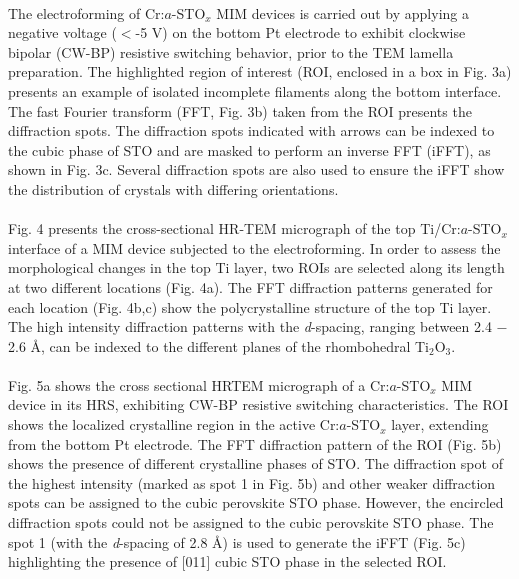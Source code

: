 \documentclass{osa-article}
\begin{document}
\paragraph*{}
The electroforming of Cr:$a$-STO$_{x}$ MIM devices is carried out by applying a negative voltage ($<$-5 V) on the bottom Pt electrode to exhibit clockwise bipolar (CW-BP) resistive switching behavior, prior to the TEM lamella preparation. The highlighted region of interest (ROI, enclosed in a box in Fig. 3a) presents an example of isolated incomplete filaments along the bottom interface. The fast Fourier transform (FFT, Fig. 3b) taken from the ROI presents the diffraction spots. The diffraction spots indicated with arrows can be indexed to the cubic phase of STO and are masked to perform an inverse FFT (iFFT), as shown in Fig. 3c. Several diffraction spots are also used to ensure the iFFT show the distribution of crystals with differing orientations.
\paragraph*{}
Fig. 4 presents the cross-sectional HR-TEM micrograph of the top Ti/Cr:$a$-STO$_{x}$ interface of a MIM device subjected to the electroforming. In order to assess the morphological changes in the top Ti layer, two ROIs are selected along its length at two different locations (Fig. 4a). The FFT diffraction patterns generated for each location (Fig. 4b,c) show the polycrystalline structure of the top Ti layer. The high intensity diffraction patterns with the \textit{d}-spacing, ranging between 2.4 $-$ 2.6 \AA,  can be indexed to the different planes of the rhombohedral Ti$_{2}$O$_{3}$.
\paragraph*{}
Fig. 5a shows the cross sectional HRTEM micrograph of a Cr:$a$-STO$_{x}$ MIM device in its HRS, exhibiting CW-BP resistive switching characteristics. The ROI shows the localized crystalline region in the active Cr:$a$-STO$_{x}$ layer, extending from the bottom Pt electrode. The FFT diffraction pattern of the ROI (Fig. 5b) shows the presence of different crystalline phases of STO. The diffraction spot of the highest intensity (marked as spot 1 in Fig. 5b) and other weaker diffraction spots can be assigned to the cubic perovskite STO phase. However, the encircled diffraction spots could not be assigned to the cubic perovskite STO phase. The spot 1 (with the \textit{d}-spacing of 2.8 \AA) is used to generate the iFFT (Fig. 5c) highlighting the presence of [011] cubic STO phase in the selected ROI.
\end{document}
